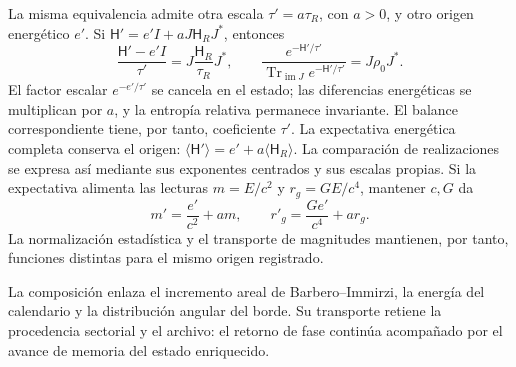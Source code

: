 La misma equivalencia admite otra escala \(\tau'=a\tau_R\),
con \(a>0\), y otro origen energético \(e'\). Si
\(\mathsf H'=e'I+aJ\mathsf H_RJ^*\), entonces
\[
 \frac{\mathsf H'-e'I}{\tau'}
 =J\frac{\mathsf H_R}{\tau_R}J^*,\qquad
 \frac{e^{-\mathsf H'/\tau'}}
      {\operatorname{Tr}_{\operatorname{im}J}e^{-\mathsf H'/\tau'}}
 =J\rho_0J^*.
\]
El factor escalar \(e^{-e'/\tau'}\) se cancela en el estado;
las diferencias energéticas se multiplican por \(a\), y la entropía
relativa permanece invariante. El balance correspondiente tiene, por
tanto, coeficiente \(\tau'\). La expectativa energética completa
conserva el origen: \(\langle\mathsf H'\rangle
=e'+a\langle\mathsf H_R\rangle\). La comparación de realizaciones
se expresa así mediante sus exponentes centrados y sus escalas propias.
Si la expectativa alimenta las lecturas \(m=E/c^2\) y
\(r_g=GE/c^4\), mantener \(c,G\) da
\[
 m'=\frac{e'}{c^2}+am,\qquad
 r'_g=\frac{Ge'}{c^4}+ar_g.
\]
La normalización estadística y el transporte de magnitudes mantienen,
por tanto, funciones distintas para el mismo origen registrado.

La composición enlaza el incremento areal de Barbero--Immirzi, la energía
del calendario y la distribución angular del borde. Su transporte
retiene la procedencia sectorial y el archivo: el retorno de fase
continúa acompañado por el avance de memoria del estado enriquecido.
